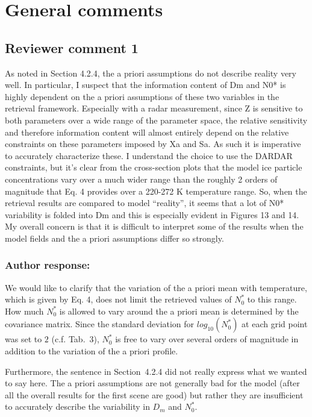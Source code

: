 \documentclass[11pt]{scrartcl}
\author{simon}
\date{\today}
\title{}
\begin{document}
\setlength{\parindent}{0cm}

\section{General comments}

\subsection*{Reviewer comment 1}

As noted in Section 4.2.4, the a priori assumptions do not describe reality very
well. In particular, I suspect that the information content of Dm and N0* is
highly dependent on the a priori assumptions of these two variables in the
retrieval framework. Especially with a radar measurement, since Z is sensitive
to both parameters over a wide range of the parameter space, the relative
sensitivity and therefore information content will almost entirely depend on the
relative constraints on these parameters imposed by Xa and Sa. As such it is
imperative to accurately characterize these. I understand the choice to use the
DARDAR constraints, but it’s clear from the cross-section plots that the model
ice particle concentrations vary over a much wider range than the roughly 2
orders of magnitude that Eq. 4 provides over a 220-272 K temperature range. So,
when the retrieval results are compared to model “reality”, it seems that a lot
of N0* variability is folded into Dm and this is especially evident in Figures
13 and 14. My overall concern is that it is difficult to interpret some of the
results when the model fields and the a priori assumptions differ so strongly.

\subsubsection*{Author response:}

We would like to clarify that the variation of the a priori mean with
temperature, which is given by Eq. 4, does not limit the retrieved values of
$N_0^*$ to this range. How much $N_0^*$ is allowed to vary around the a priori
mean is determined by the covariance matrix. Since the standard deviation for
$log_{10}(N_0^*)$ at each grid point was set to $2$ (c.f. Tab.~3), $N_0^*$ is
free to vary over several orders of magnitude in addition to the variation of
the a priori profile.

Furthermore, the sentence in Section~4.2.4 did not really express what we wanted
to say here. The a priori assumptions are not generally bad for the model
(after all the overall results for the first scene are good) but rather they are
insufficient to accurately describe the variability in $D_m$ and $N_0^*$.
\end{document}
